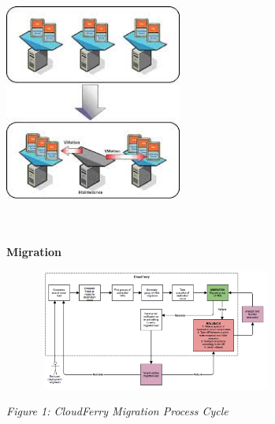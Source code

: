 \documentclass{article}
\begin{document}
\vspace{2pt}
\begin{center}
\includegraphics[width=220, height=242pt, keepaspectratio=true]{images/CloudFerry_Brochure-fig005.jpg}

\end{center}

\vspace{54pt}
\baselineskip=12pt

{\large{}{\color{color03} \textbf{Migration}}}

\begin{center}
\includegraphics[width=285pt, height=150, keepaspectratio=true]{images/CloudFerry_Brochure-fig006.png}

\vspace{2pt}
{\small{}{\color{color09} \textit{Figure 1: CloudFerry Migration Process Cycle}}}
\end{center}
\end{document}
